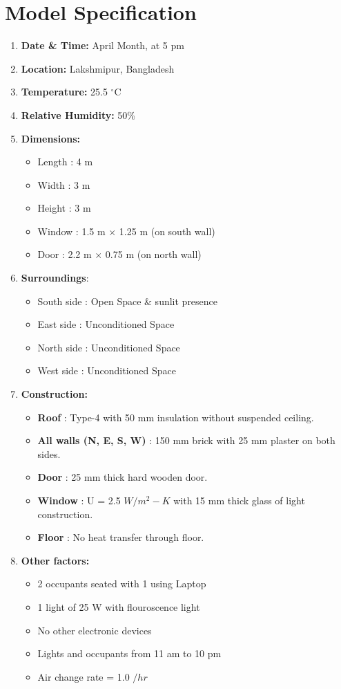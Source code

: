 \documentclass{article}
\begin{document}
\section{Model Specification}
\begin{enumerate}
  \item \textbf{Date \& Time:} April Month, at 5 pm 
  \item \textbf{Location:} Lakshmipur, Bangladesh
  \item \textbf{Temperature:} 25.5 $^{\circ}$C
  \item \textbf{Relative Humidity:} 50\%
  \item \textbf{Dimensions:}
  \begin{itemize}
    \item Length : 4 m
    \item Width : 3 m
    \item Height : 3 m
    \item Window : 1.5 m $\times$ 1.25 m (on south wall)
    \item Door : 2.2 m $\times$ 0.75 m (on north wall)
  \end{itemize}
  \item \textbf{Surroundings}:
  \begin{itemize}
    \item South side : Open Space \& sunlit presence
    \item East side : Unconditioned Space 
    \item North side : Unconditioned Space 
    \item West side : Unconditioned Space 
  \end{itemize}
  \item \textbf{Construction:}
  \begin{itemize}
    \item \textbf{Roof} : Type-4 with 50 mm insulation without suspended ceiling. 
    \item \textbf{All walls (N, E, S, W)} : 150 mm  brick with 25 mm plaster on both sides.
    \item \textbf{Door} : 25 mm thick hard wooden door.
    \item \textbf{Window} : U = 2.5 $W/m^2-K$ with 15 mm thick glass of light construction.
    \item \textbf{Floor} : No heat transfer through floor. 
  \end{itemize}
  \item \textbf{Other factors:}
  \begin{itemize}
    \item 2 occupants seated with 1 using Laptop 
    \item 1 light of 25 W with flouroscence light 
    \item No other electronic devices 
    \item Lights and occupants from 11 am to 10 pm 
    \item Air change rate = 1.0 $/hr$
  \end{itemize} 
\end{enumerate}
\pagebreak
\end{document}
